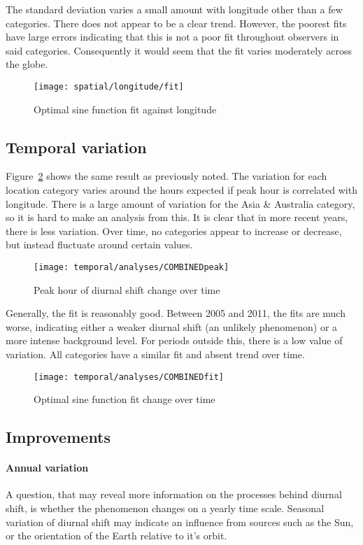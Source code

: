 The standard deviation varies a small amount with longitude other than a few categories. There does not appear to be a clear trend.  However, the poorest fits have large errors indicating that this is not a poor fit throughout observers in said categories. Consequently it would seem that the fit varies moderately across the globe. 
\begin{figure}[h!]
	\centering
	\texttt{[image: spatial/longitude/fit]}
	\caption{Optimal sine function fit against longitude
		\label{fig:dishift:lon:fit}}
\end{figure}


\subsection{Temporal variation}
Figure~\ref{fig:dishift:temp:peak} shows the same result as previously noted. The variation for each location category varies around the hours expected if peak hour is correlated with longitude. There is a large amount of variation for the Asia \& Australia category, so it is hard to make an analysis from this. It is clear that in more recent years, there is less variation. Over time, no categories appear to increase or decrease, but instead fluctuate around certain values.
\begin{figure}[h!]
	\centering
	\texttt{[image: temporal/analyses/COMBINEDpeak]}
	\caption{Peak hour of diurnal shift change over time
		\label{fig:dishift:temp:peak}}
\end{figure}
Generally, the fit is reasonably good. Between 2005 and 2011, the fits are much worse, indicating either a weaker diurnal shift (an unlikely phenomenon) or a more intense background level. For periods outside this, there is a low value of variation. All categories have a similar fit and absent trend over time.
\begin{figure}[h!]
	\centering
	\texttt{[image: temporal/analyses/COMBINEDfit]}
	\caption{Optimal sine function fit change over time
		\label{fig:dishift:temp:fit}}
\end{figure}
\subsection{Improvements}
\paragraph{Annual variation\\}
A question, that may reveal more information on the processes behind diurnal shift, is whether the phenomenon changes on a yearly time scale. Seasonal variation of diurnal shift may indicate an influence from sources such as the Sun, or the orientation of the Earth relative to it's orbit.
